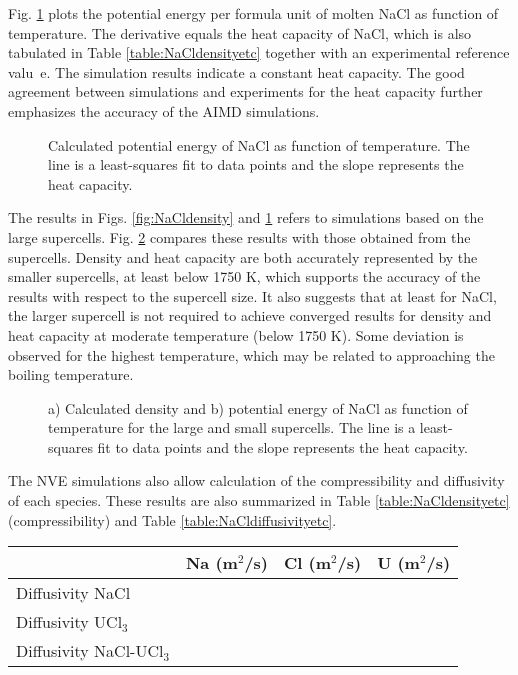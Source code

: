 \documentclass[preprint,3p,10pt,twocolumn,number,sort&compress]{elsarticle}
\begin{document}
Fig. \ref{fig:NaClheatc} plots the potential energy per formula unit of molten NaCl as function of temperature. The derivative equals the heat capacity of NaCl, which is also tabulated in Table \ref{table:NaCldensityetc} together with an experimental reference valu~\cite{}e. The simulation results indicate a constant heat capacity. The good agreement between simulations and experiments for the heat capacity further emphasizes the accuracy of the AIMD simulations.  

\begin{figure}[htb]
\centering
\caption{Calculated potential energy of NaCl as function of temperature. The line is a least-squares fit to data points and the slope represents the heat capacity.} 
\label{fig:NaClheatc}
\end{figure}

The results in Figs. \ref{fig:NaCldensity} and \ref{fig:NaClheatc} refers to simulations based on the large supercells. Fig. \ref{fig:NaClsize} compares these results with those obtained from the supercells. Density and heat capacity are both accurately represented by the smaller supercells, at least below 1750 K, which supports the accuracy of the results with respect to the supercell size. It also suggests that at least for NaCl, the larger supercell is not required to achieve converged results for density and heat capacity at moderate temperature (below 1750 K). Some deviation is observed for the highest temperature, which may be related to approaching the boiling temperature. 

\begin{figure}[htb]
\centering
\caption{a) Calculated density and b) potential energy of NaCl as function of temperature for the large and small supercells. The line is a least-squares fit to data points and the slope represents the heat capacity.} 
\label{fig:NaClsize}
\end{figure}

The NVE simulations also allow calculation of the compressibility and diffusivity of each species. These results are also summarized in Table \ref{table:NaCldensityetc} (compressibility) and Table \ref{table:NaCldiffusivityetc}.

 \begin{table*}[hb!]
\centering
\begin{tabular}{lccc}
\hline
\hline
&Na	(m$^2$/s)&Cl (m$^2$/s)&U (m$^2$/s)\\
\hline
Diffusivity NaCl & & &\\
Diffusivity UCl$_3$	& & &\\
Diffusivity NaCl-UCl$_3$ & & &\\
\hline
\hline
\end{tabular}
\caption{Calculated diffusivities for each species in NaCl, UCl$_3$ and  NaCl-UCl$_3$.}
\label{table:NaCldiffusivityetc}
\end{table*}
\end{document}
